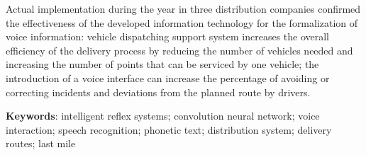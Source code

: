 Actual implementation during the year in three distribution companies confirmed the effectiveness of the developed information technology for the formalization of voice information: vehicle dispatching support system increases the overall efficiency of the delivery process by reducing the number of vehicles needed and increasing the number of points that can be serviced by one vehicle; the introduction of a voice interface can increase the percentage of avoiding or correcting incidents and deviations from the planned route by drivers.


\textbf{Keywords}: intelligent reflex systems; convolution neural network; voice interaction; speech recognition; phonetic text; distribution system; delivery routes; last mile

